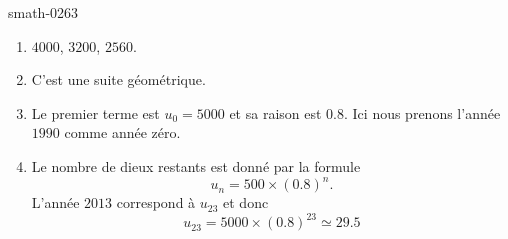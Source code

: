 
\begin{corrige}{smath-0263}

    \begin{enumerate}
        \item
            \( 4000\), \( 3200\), \( 2560\).
        \item
            C'est une suite géométrique.
        \item
            Le premier terme est \( u_{0}=5000\) et sa raison est \( 0.8\). Ici nous prenons l'année \( 1990\) comme année zéro.
        \item
            Le nombre de dieux restants est donné par la formule
            \begin{equation}
                u_n=500\times (0.8)^n.
            \end{equation}
            L'année \( 2013\) correspond à \( u_{23}\) et donc
            \begin{equation}
                u_{23}=5000\times (0.8)^{23}\simeq 29.5
            \end{equation}
    \end{enumerate}

\end{corrige}
